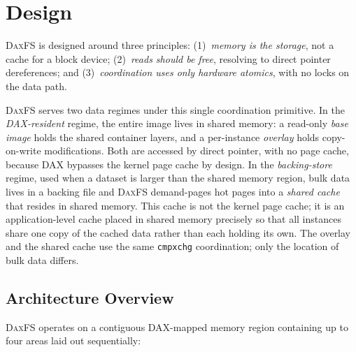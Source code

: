 \documentclass[letterpaper,twocolumn,10pt]{article}
\newcommand{\daxfs}{\textsc{DaxFS}\xspace}
\begin{document}
\section{Design}
\label{sec:design}

\daxfs is designed around three principles: (1)~\emph{memory is the
storage}, not a cache for a block device; (2)~\emph{reads should be
free}, resolving to direct pointer dereferences; and
(3)~\emph{coordination uses only hardware atomics}, with no locks on
the data path.

\daxfs serves two data regimes under this single coordination
primitive.  In the \emph{DAX-resident} regime, the entire image lives
in shared memory: a read-only \emph{base image} holds the shared
container layers, and a per-instance \emph{overlay} holds
copy-on-write modifications.  Both are accessed by direct pointer, with
no page cache, because DAX bypasses the kernel page cache by design.
In the \emph{backing-store} regime, used when a dataset is larger than
the shared memory region, bulk data lives in a backing file and \daxfs
demand-pages hot pages into a \emph{shared cache} that resides in
shared memory.  This cache is not the kernel page cache; it is an
application-level cache placed in shared memory precisely so that all
instances share one copy of the cached data rather than each holding
its own.  The overlay and the shared cache use the same
\texttt{cmpxchg} coordination; only the location of bulk data differs.

\subsection{Architecture Overview}

\daxfs operates on a contiguous DAX-mapped memory region containing
up to four areas laid out sequentially:
\end{document}
